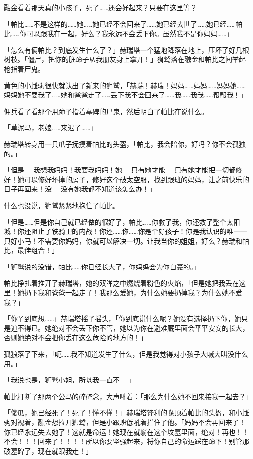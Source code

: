 融金看着那天真的小孩子，死了……还会好起来？只要在这里等？

「帕比……不是这样的……她……她已经不会回来了……她已经去世了……她已经……帕比……你可以跟我在一起，好么？我永远不会丢下你。虽然我不是你妈妈……」

「怎么有俩帕比？到底发生什么了？」赫瑞塔一个猛地降落在地上，压坏了好几根树枝。「僵尸，把你的脏蹄子从我朋友身上拿开！」狮鹫落在融金和帕比之间举起枪指着尸鬼。

黄色的小雌驹很快就认出了新来的狮鹫，「赫瑞！赫瑞！妈妈……妈妈……妈妈她……妈妈她不要我了……她和爸爸走了……丢下我不会回来了……我……我我……帮帮我！」

佣兵看了看那个用蹄子指着墓碑的尸鬼，然后明白了帕比在说什么。

「草泥马，老娘……来迟了……」

赫瑞塔转身用一只爪子抚摸着帕比的头盔，「帕比，我会陪你，好吗？你不会孤独的。」

「但是……我想我妈妈！我要我妈妈！她……只有她才能……只有她才能把一切都修好！她可以修好坏掉的房子，修好这个破太空服，找到跟班的妈妈，让之前快乐的日子再回来！没……没有她我都不知道该怎么办！」

什么也没说，狮鹫紧紧地抱住了帕比。

「但是……但是你自己就已经做的很好了，帕比……你救了我，你还救了整个太阳城！你还阻止了铁骑卫的内战！你还……你……你是个好孩子！你是我认识的唯一一只好小马！不需要你妈妈，你就可以解决一切。让我当你的姐姐，好么？赫瑞和帕比，最佳组合！」

「狮鹫说的没错，帕比……你已经长大了，你妈妈会为你自豪的。」

帕比挣扎着推开了赫瑞塔，她的双眸之中燃烧着粉色的火焰，「但是她把我丢在这里！她扔下我和爸爸一起走了！我那么爱她，为什么她要扔掉我？为什么她不爱我？」

「你丫到底想……」赫瑞塔摇了摇头，「你到底说什么呢？她没有选择扔下你，她只是迫不得已。她绝对不会丢下你不管，她以为你在避难厩里面会平平安安的长大，否则她绝对不会把你丢在这么危险的地方的！」

孤狼落了下来，「呃……我不知道发生了什么，但是我觉得对小孩子大喊大叫没什么用。」

「我说也是，狮鹫小姐，所以我一直不……」

帕比打断了那两个公马的碎碎念，大声吼着：「那么为什么她不回来接我一起去？」

「傻瓜，她已经死了！死了！懂不懂！」赫瑞塔锋利的喙顶着帕比的头盔，和小雌驹对视着，融金想拉开狮鹫，但是小跟班低吼着拦住了他。「妈妈不会再回来了！你已经永远失去她了！这就是命运！她现在就躺在这个坟墓里面，绝对！再也！！不会！！！回来了！！！！所以你要坚强起来，将你自己的命运踩在蹄下！别管那破墓碑了，现在就跟我走！」


